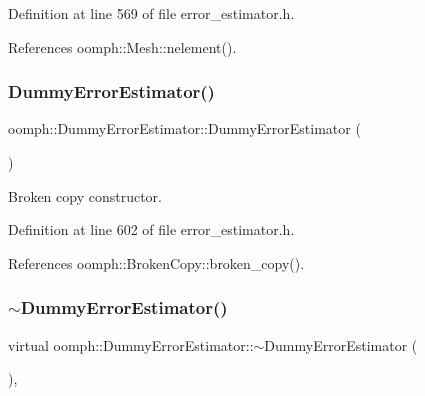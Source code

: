 Definition at line 569 of file error\+\_\+estimator.\+h.



References oomph\+::\+Mesh\+::nelement().

\mbox{\label{classoomph_1_1DummyErrorEstimator_a69397622563794501de5bbbeb8c072ab}} 
\subsubsection{\texorpdfstring{Dummy\+Error\+Estimator()}{DummyErrorEstimator()}\hspace{0.1cm}{\footnotesize\ttfamily [3/3]}}
{\footnotesize\ttfamily oomph\+::\+Dummy\+Error\+Estimator\+::\+Dummy\+Error\+Estimator (\begin{DoxyParamCaption}\item[{const \hyperlink{classoomph_1_1DummyErrorEstimator}{Dummy\+Error\+Estimator} \&}]{ }\end{DoxyParamCaption})\hspace{0.3cm}{\ttfamily [inline]}}



Broken copy constructor. 



Definition at line 602 of file error\+\_\+estimator.\+h.



References oomph\+::\+Broken\+Copy\+::broken\+\_\+copy().

\mbox{\label{classoomph_1_1DummyErrorEstimator_ac379252c48c85e03d9a5bc8b8c0d2d5e}} 
\subsubsection{\texorpdfstring{$\sim$\+Dummy\+Error\+Estimator()}{~DummyErrorEstimator()}}
{\footnotesize\ttfamily virtual oomph\+::\+Dummy\+Error\+Estimator\+::$\sim$\+Dummy\+Error\+Estimator (\begin{DoxyParamCaption}{ }\end{DoxyParamCaption})\hspace{0.3cm}{\ttfamily [inline]}, {\ttfamily [virtual]}}



